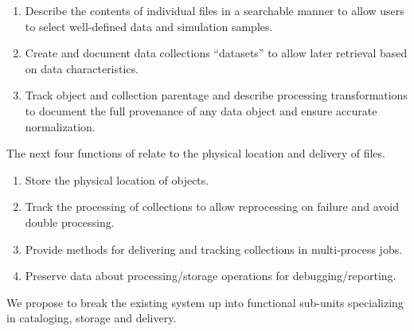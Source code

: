 \documentclass[../main-v1.tex]{subfiles}
\begin{document}
\begin{enumerate}

\item	Describe the contents of individual files in a searchable manner to allow users to select well-defined data and simulation samples. 

\item	Create and document data collections ``datasets'' to allow later retrieval based on data characteristics.

 \item	Track object and collection parentage and describe processing transformations to document the full provenance of any data object and ensure accurate normalization.


\end{enumerate}
The next four functions of  relate to the physical location and delivery of files.
\begin{enumerate}
 \item	Store the physical  location of objects.

 \item	Track the processing of collections to allow reprocessing on failure and avoid double processing.

 \item	Provide methods for delivering and tracking collections in multi-process jobs.

 \item	Preserve data about processing/storage operations for debugging/reporting.

\end{enumerate}
 We propose to break the existing system up into functional sub-units specializing in cataloging, storage and delivery. 
\end{document}
